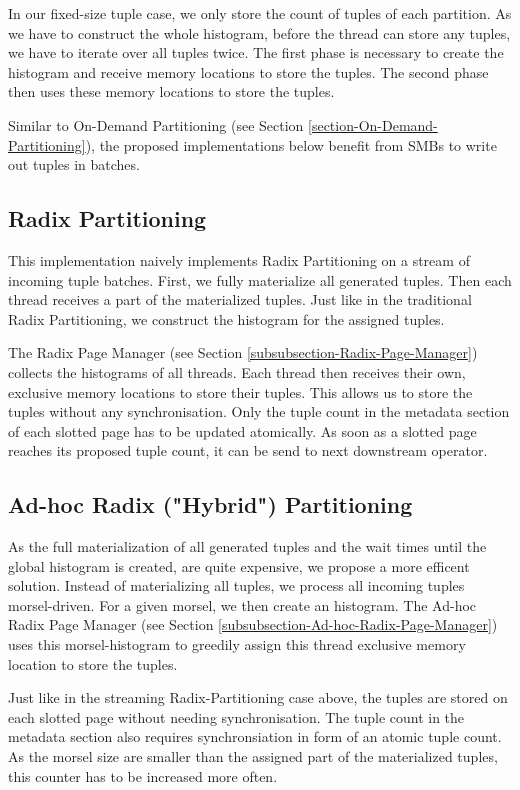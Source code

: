 In our fixed-size tuple case, we only store the count of tuples of each partition.
As we have to construct the whole histogram, before the thread can store any tuples, we have to iterate over all tuples twice.
The first phase is necessary to create the histogram and receive memory locations to store the tuples.
The second phase then uses these memory locations to store the tuples.

Similar to On-Demand Partitioning (see Section \ref{section-On-Demand-Partitioning}), the proposed implementations below benefit from \acfp{SMB} to write out tuples in batches.
\subsection{Radix Partitioning}
This implementation naively implements Radix Partitioning on a stream of incoming tuple batches.
First, we fully materialize all generated tuples.
Then each thread receives a part of the materialized tuples.
Just like in the traditional Radix Partitioning, we construct the histogram for the assigned tuples.

The Radix Page Manager (see Section \ref{subsubsection-Radix-Page-Manager}) collects the histograms of all threads.
Each thread then receives their own, exclusive memory locations to store their tuples.
This allows us to store the tuples without any synchronisation.
Only the tuple count in the metadata section of each slotted page has to be updated atomically.
As soon as a slotted page reaches its proposed tuple count, it can be send to next downstream operator.

\subsection{Ad-hoc Radix ("Hybrid") Partitioning}
As the full materialization of all generated tuples and the wait times until the global histogram is created, are quite expensive, we propose a more efficent solution.
Instead of materializing all tuples, we process all incoming tuples morsel-driven.
For a given morsel, we then create an histogram.
The Ad-hoc Radix Page Manager (see Section \ref{subsubsection-Ad-hoc-Radix-Page-Manager}) uses this morsel-histogram to greedily assign this thread exclusive memory location to store the tuples.

Just like in the streaming Radix-Partitioning case above, the tuples are stored on each slotted page without needing synchronisation.
The tuple count in the metadata section also requires synchronsiation in form of an atomic tuple count.
As the morsel size are smaller than the assigned part of the materialized tuples, this counter has to be increased more often.

